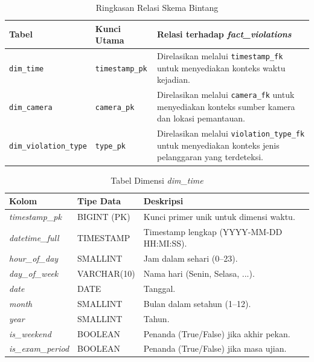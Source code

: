 \begin{table}[H]
\centering
\caption{Ringkasan Relasi Skema Bintang}
\label{tab:ringkasan-relasi-star-schema}
\small\setlength{\tabcolsep}{4pt}\begin{tabularx}{\textwidth}{>{\raggedright\arraybackslash}p{}>{\raggedright\arraybackslash}p{}>{\raggedright\arraybackslash}X}
\toprule
\textbf{Tabel} & \textbf{Kunci Utama} & \textbf{Relasi terhadap \textit{fact\_violations}} \\
\midrule
\texttt{dim\_time} & \texttt{timestamp\_pk} & Direlasikan melalui \texttt{timestamp\_fk} untuk menyediakan konteks waktu kejadian. \\
\texttt{dim\_camera} & \texttt{camera\_pk} & Direlasikan melalui \texttt{camera\_fk} untuk menyediakan konteks sumber kamera dan lokasi pemantauan. \\
\texttt{dim\_violation\_type} & \texttt{type\_pk} & Direlasikan melalui \texttt{violation\_type\_fk} untuk menyediakan konteks jenis pelanggaran yang terdeteksi. \\
\bottomrule
\end{tabularx}
\end{table}

\begin{table}[H]
\centering
\caption{Tabel Dimensi \textit{dim\_time}}
\label{tab:dim_time}
\small\setlength{\tabcolsep}{4pt}\begin{tabularx}{\textwidth}{>{\raggedright\arraybackslash}p{}>{\raggedright\arraybackslash}p{}>{\raggedright\arraybackslash}X}
\toprule
\textbf{Kolom} & \textbf{Tipe Data} & \textbf{Deskripsi} \\
\midrule
\textit{timestamp\_pk} & BIGINT (PK) & Kunci primer unik untuk dimensi waktu. \\
\textit{datetime\_full} & TIMESTAMP & Timestamp lengkap (YYYY-MM-DD HH:MI:SS). \\
\textit{hour\_of\_day} & SMALLINT & Jam dalam sehari (0--23). \\
\textit{day\_of\_week} & VARCHAR(10) & Nama hari (Senin, Selasa, ...). \\
\textit{date} & DATE & Tanggal. \\
\textit{month} & SMALLINT & Bulan dalam setahun (1--12). \\
\textit{year} & SMALLINT & Tahun. \\
\textit{is\_weekend} & BOOLEAN & Penanda (True/False) jika akhir pekan. \\
\textit{is\_exam\_period} & BOOLEAN & Penanda (True/False) jika masa ujian. \\
\bottomrule
\end{tabularx}
\end{table}


